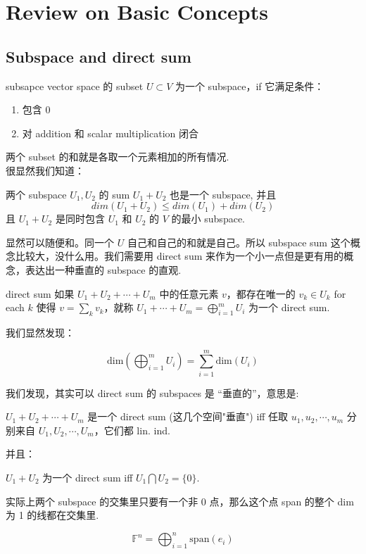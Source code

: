 \chapter{Review on Basic Concepts}
\section{Subspace and direct sum}
\begin{definition}{subsapce} \label{subspace}
vector space 的 subset $U \subset V$ 为一个 subspace，if 它满足条件：
\begin{enumerate}
    \item 包含 0
    \item 对 addition 和 scalar multiplication 闭合
\end{enumerate}
\end{definition}
两个 subset 的和就是各取一个元素相加的所有情况.\\
很显然我们知道：
\begin{proposition}
两个 subspace $U_1, U_2$ 的 sum $U_1 + U_2$ 也是一个 subspace, 并且 
$$
dim(U_1 + U_2) \leq dim(U_1) + dim(U_2)
$$
且 $U_1 + U_2$ 是同时包含 $U_1$ 和 $U_2$ 的 $V $ 的最小 subspace.
\end{proposition}

显然可以随便和。同一个 $U$ 自己和自己的和就是自己。所以 subspace sum 这个概念比较大，没什么用。我们需要用 direct sum 来作为一个小一点但是更有用的概念，表达出一种垂直的 subspace 的直观.

\begin{definition}{direct sum} \label{direct sum}
如果 $U_1 + U_2 + \cdots + U_m$ 中的任意元素 $v$，都存在唯一的 $v_k \in U_k$ for each $k$ 使得 $v = \sum_{k}v_k$，就称 $U_1 + \cdots + U_m = \bigoplus_{i = 1}^m U_i$ 为一个 direct sum.
\end{definition}

我们显然发现：
\begin{proposition}
    $$
    \text{dim}(\bigoplus_{i = 1}^m U_i) = \sum_{i = 1}^m \text{dim}(U_i) 
    $$
\end{proposition}

我们发现，其实可以 direct sum 的 subspaces 是 “垂直的”，意思是:
\begin{theorem}
    $U_1 + U_2 + \cdots + U_m$ 是一个 direct sum (这几个空间"垂直") iff 任取 $u_1, u_2, \cdots, u_m$ 分别来自 $U_1,  U_2 , \cdots, U_m$，它们都 lin. ind.
\end{theorem}
并且：
\begin{theorem}
    $U_1 + U_2$ 为一个 direct sum iff $U_1 \bigcap U_2 = \{0\}$.
\end{theorem}
\begin{remark}
实际上两个 subspace 的交集里只要有一个非 0 点，那么这个点 span 的整个 dim 为 1 的线都在交集里.
\end{remark}

\begin{note}
    $$
    \mathbb{F}^n = \bigoplus_{i =1}^n \text{span}(e_i)
    $$
\end{note}

